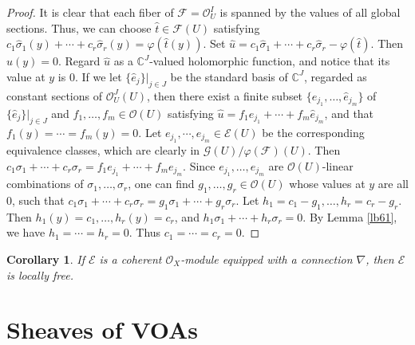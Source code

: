 \documentclass[12pt,a4paper,notitlepage]{report}
\theoremstyle{definition}
\theoremstyle{plain}
\newtheorem{co}[df]{Corollary}
\newcommand{\wht}{\widehat}
\newcommand{\scr}{\mathscr}
\newcommand{\Cbb}{\mathbb C}
\numberwithin{equation}{section}
\begin{document}
\begin{proof}
It is clear that each fiber of $\scr F=\scr O_U^I$ is spanned by the values of all global sections. Thus, we can choose $\wht t\in\scr F(U)$ satisfying $c_1\wht \sigma_1(y)+\cdots+c_r\wht \sigma_r(y)=\varphi(\wht t(y))$. Set $\wht u=c_1\wht \sigma_1+\cdots+c_r\wht \sigma_r-\varphi(\wht t)$. Then $\wht u(y)=0$. Regard $\wht u$ as a $\Cbb^J$-valued holomorphic function, and notice that its value at $y$ is $0$. If we let $\{\wht e_j\}|_{j\in J}$ be the standard basis of $\Cbb^J$, regarded as constant sections of $\scr O_U^J(U)$, then there exist a finite subset $\{\wht e_{j_1},\dots,\wht e_{j_m}\}$ of $\{\wht e_j\}|_{j\in J}$ and $f_1,\dots,f_m\in\scr O(U)$ satisfying $\wht u=f_1\wht e_{j_1}+\cdots+f_m\wht e_{j_m}$, and that $f_1(y)=\cdots=f_m(y)=0$. Let $e_{j_1},\cdots,e_{j_m}\in \scr E(U)$ be the corresponding equivalence classes, which are clearly in $\scr G(U)/\varphi(\scr F)(U)$. Then $c_1\sigma_1+\cdots+c_r\sigma_r=f_1e_{j_1}+\cdots+f_me_{j_m}$. Since  $e_{j_1},\dots,e_{j_m}$ are $\scr O(U)$-linear combinations of $\sigma_1,\dots,\sigma_r$, one can find $g_1,\dots,g_r\in\scr O(U)$ whose values at $y$ are all $0$, such that $c_1\sigma_1+\cdots+c_r\sigma_r=g_1\sigma_1+\cdots+g_r\sigma_r$. Let $h_1=c_1-g_1,\dots,h_r=c_r-g_r$. Then $h_1(y)=c_1,\dots,h_r(y)=c_r$, and $h_1\sigma_1+\cdots+h_r\sigma_r=0$. By Lemma \ref{lb61}, we have $h_1=\cdots=h_r=0$. Thus $c_1=\cdots=c_r=0$.
\end{proof}


\begin{co}
If $\scr E$ is a coherent $\scr O_X$-module equipped with a connection $\nabla$, then $\scr E$ is locally free.
\end{co}

















\chapter{Sheaves of VOAs}\label{lb90}
\end{document}
